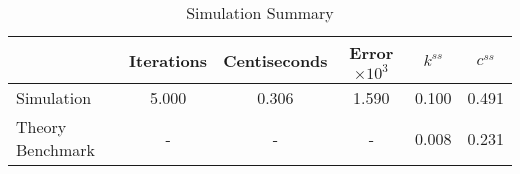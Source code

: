 \begin{table}[htb]
\centering
\caption{Simulation Summary}
\label{table:psCp2:tab:sim2b}
\begin{tabular}{lccccc}
\hline
 & Iterations & Centiseconds & Error$\times 10^3$ & $k^{ss}$ & $c^{ss}$ \\
\hline\hline
Simulation & 5.000 & 0.306 & 1.590 & 0.100 & 0.491 \\
Theory Benchmark & - & - & - & 0.008 & 0.231 \\
\hline
\end{tabular}
\end{table}
